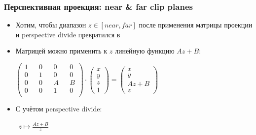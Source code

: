 \documentclass[10pt]{beamer}
\begin{document}
\begin{frame}[fragile]
\frametitle{Перспективная проекция: near \& far clip planes}
\begin{itemize}
\item Хотим, чтобы диапазон \begin{math}z\in [near,far]\end{math} после применения матрицы проекции и perspective divide превратился в \begin{math}[0,1]\end{math}
\pause
\item Матрицей можно применить к \begin{math}z\end{math} линейную функцию \begin{math}Az+B\end{math}:
\begin{center}
\begin{math}
\begin{pmatrix}
1 && 0 && 0 && 0 \\
0 && 1 && 0 && 0 \\
0 && 0 && A && B \\
0 && 0 && 1 && 0 \\
\end{pmatrix}
\cdot
\begin{pmatrix}
x \\ y \\ z \\ 1
\end{pmatrix}
=
\begin{pmatrix}
x \\ y \\ Az+B \\ z
\end{pmatrix}
\end{math}
\end{center}
\pause
\item С учётом perspective divide:
\begin{center}
\begin{math}
\begin{matrix}
z \mapsto \frac{Az + B}{z}
\end{matrix}
\end{math}
\end{center}
\end{itemize}
\end{frame}
\end{document}
